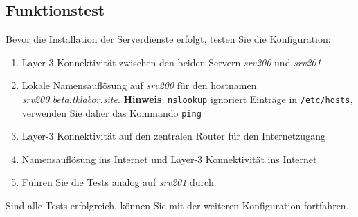 \subsection{Funktionstest}
Bevor die Installation der Serverdienste erfolgt, testen Sie die Konfiguration:
\begin{enumerate}
  \item Layer-3 Konnektivität zwischen den beiden Servern \textit{srv200} und
  \textit{srv201}
  \item Lokale Namensauflösung auf \textit{srv200} für den hostnamen
  \textit{srv200.beta.tklabor.site}. \textbf{Hinweis}: \texttt{nslookup}
  ignoriert Einträge in \texttt{/etc/hosts}, verwenden Sie daher das
  Kommando \texttt{ping}
  \item Layer-3 Konnektivität auf den zentralen Router für den Internetzugang
  \item Namensauflösung ins Internet und Layer-3 Konnektivität ins Internet
  \item Führen Sie die Tests analog auf \textit{srv201} durch.
\end{enumerate}

Sind alle Tests erfolgreich, können Sie mit der weiteren Konfiguration
fortfahren.

